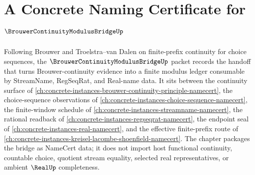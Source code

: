 \chapter{A Concrete Naming Certificate for $\BrouwerContinuityModulusBridgeUp$}
\label{ch:concrete-instances-brouwer-continuity-modulus-bridge-namecert}

Following Brouwer and Troelstra--van Dalen on finite-prefix continuity for choice sequences, the $\BrouwerContinuityModulusBridgeUp$ packet records the handoff that turns Brouwer-continuity evidence into a finite modulus ledger consumable by StreamName, RegSeqRat, and Real-name data. It sits between the continuity surface of \autoref{ch:concrete-instances-brouwer-continuity-principle-namecert}, the choice-sequence observations of \autoref{ch:concrete-instances-choice-sequence-namecert}, the finite-window schedule of \autoref{ch:concrete-instances-streamname-namecert}, the rational readback of \autoref{ch:concrete-instances-regseqrat-namecert}, the endpoint seal of \autoref{ch:concrete-instances-real-namecert}, and the effective finite-prefix route of \autoref{ch:concrete-instances-kreisel-lacombe-shoenfield-namecert}. The chapter packages the bridge as NameCert data; it does not import host functional continuity, countable choice, quotient stream equality, selected real representatives, or ambient $\RealUp$ completeness.


